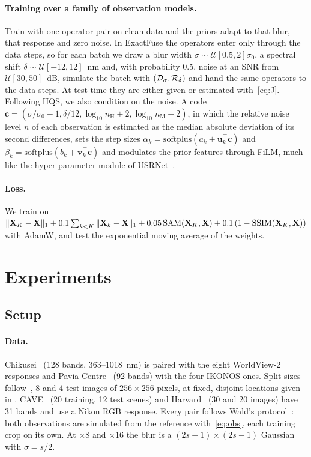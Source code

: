 \documentclass[10pt,twocolumn,letterpaper]{article}
\begin{document}
\paragraph{Training over a family of observation models.} Train with one operator pair on clean data and the priors adapt to that blur, that response and zero noise. In ExactFuse the operators enter only through the data steps, so for each batch we draw a blur width $\sigma\sim\mathcal{U}[0.5,2]\sigma_0$, a spectral shift $\delta\sim\mathcal{U}[-12,12]$~nm and, with probability 0.5, noise at an SNR from $\mathcal{U}[30,50]$~dB, simulate the batch with $(\mathcal{D}_\sigma,\mathcal{R}_\delta)$ and hand the same operators to the data steps. At test time they are either given or estimated with~\eqref{eq:J}. Following HQS, we also condition on the noise. A code $\mathbf{c}=(\sigma/\sigma_0-1,\delta/12,\log_{10}n_{\mathrm{H}}+2,\log_{10}n_{\mathrm{M}}+2)$, in which the relative noise level $n$ of each observation is estimated as the median absolute deviation of its second differences, sets the step sizes $\alpha_k=\mathrm{softplus}(a_k+\mathbf{u}_k^{\top}\mathbf{c})$ and $\beta_k=\mathrm{softplus}(b_k+\mathbf{v}_k^{\top}\mathbf{c})$ and modulates the prior features through FiLM, much like the hyper-parameter module of USRNet~\cite{zhang2020usrnet}.

\paragraph{Loss.} We train on $\|\mathbf{X}_K-\mathbf{X}\|_1+0.1\sum_{k<K}\|\mathbf{X}_k-\mathbf{X}\|_1+0.05\,\mathrm{SAM}(\mathbf{X}_K,\mathbf{X})+0.1\,(1-\mathrm{SSIM}(\mathbf{X}_K,\mathbf{X}))$ with AdamW, and test the exponential moving average of the weights.

\section{Experiments}
\label{sec:exp}
\subsection{Setup}
\label{sec:setup}
\paragraph{Data.} Chikusei~\cite{yokoya2016chikusei} (128 bands, 363--1018~nm) is paired with the eight WorldView-2 responses and Pavia Centre~\cite{gamba2004pavia} (92 bands) with the four IKONOS ones. Split sizes follow~\cite{chen2026twostage}, 8 and 4 test images of $256\times256$ pixels, at fixed, disjoint locations given in \supp. CAVE~\cite{yasuma2010cave} (20 training, 12 test scenes) and Harvard~\cite{chakrabarti2011harvard} (30 and 20 images) have 31 bands and use a Nikon RGB response. Every pair follows Wald's protocol~\cite{vivone2015critical}: both observations are simulated from the reference with~\eqref{eq:obs}, each training crop on its own. At $\times8$ and $\times16$ the blur is a $(2s-1)\times(2s-1)$ Gaussian with $\sigma=s/2$.
\end{document}
